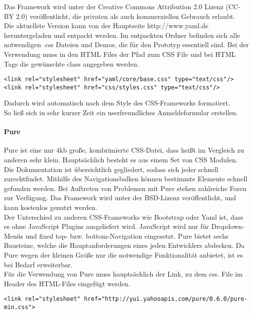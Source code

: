 Das Framework wird unter der Creative Commons Attribution 2.0 Lizenz (CC-BY 2.0) veröffentlicht, die privaten als auch kommerziellen Gebrauch erlaubt.\\

Die aktuellste Version kann von der Hauptseite http://www.yaml.de heruntergeladen und entpackt werden. Im entpackten Ordner befinden sich alle notwendigen .css Dateien und Demos, die für den Prototyp essentiell sind. Bei der Verwendung muss in den HTML Files der Pfad zum CSS File und bei HTML Tags die gewünschte class angegeben werden. 
\begin{lstlisting}[caption={YAML einbinden \cite{YAMLPROTO}}]
<link rel="stylesheet" href="yaml/core/base.css" type="text/css"/>
<link rel="stylesheet" href="css/styles.css" type="text/css"/>
\end{lstlisting}

Dadurch wird automatisch nach dem Style des CSS-Frameworks formatiert.\\
So ließ sich in sehr kurzer Zeit ein userfreundliches Anmeldeformular erstellen.

\paragraph{Pure}
Pure ist eine nur 4kb große, kombrimierte CSS-Datei, dass heißt im Vergleich zu anderen sehr klein. Hauptsächlich besteht es aus einem Set von CSS Modulen. Die Dokumentation ist übersichtlich gegliedert, sodass sich jeder schnell zurechtfindet. Mithilfe des Navigationsbalken können bestimmte Elemente schnell gefunden werden. Bei Auftreten von Problemen mit Pure stehen zahlreiche Foren zur Verfügung. Das Framework wird unter der BSD-Lizenz veröffentlicht, und kann kostenlos genutzt werden.\\

Der Unterschied zu anderen CSS-Frameworks wie Bootstrap oder Yaml ist, dass es ohne JavaScript Plugins ausgeliefert wird. JavaScript wird nur für Dropdown-Menüs und fixed top- bzw. bottom-Navigation eingesetzt. Pure bietet sechs Bausteine, welche die Hauptanforderungen eines jeden Entwicklers abdecken. Da Pure wegen der kleinen Größe nur die notwendige Funktionalität anbietet, ist es bei Bedarf erweiterbar.\\

Für die Verwendung von Pure muss hauptsächlich der Link, zu dem css. File im Header des HTML-Files eingefügt werden. \cite{PURE}
\begin{lstlisting}[caption={Pure einbinden \cite{PURE}}]
<link rel="stylesheet" href="http://yui.yahooapis.com/pure/0.6.0/pure-min.css">
\end{lstlisting}

